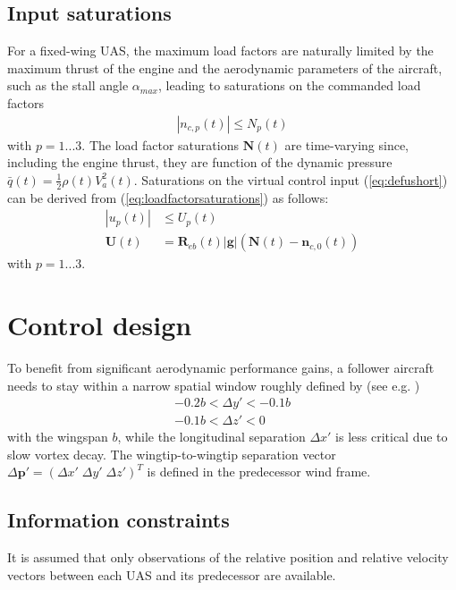 \documentclass{ifacconf}
\providecommand{\mbf}[1]{\mathbf{#1}}
\newcommand{\idxAxis}{{\ensuremath{p}}}
\begin{document}
\subsection{Input saturations}
For a fixed-wing UAS, the maximum load factors are naturally limited by the maximum thrust of the engine and the aerodynamic parameters of the aircraft, such as the stall angle $\alpha_{max}$, leading to saturations on the commanded load factors
\begin{align}
|{n}_{c, \idxAxis}(t)| \leq {N}_\idxAxis(t)
\label{eq:loadfactorsaturations}
\end{align}
with $\idxAxis = 1...3$. The load factor saturations $\mbf{N}(t)$ are time-varying since, including the engine thrust, they are function of the dynamic pressure $\bar{q}(t) = \frac{1}{2}\rho(t) V_a^2(t)$.
Saturations on the virtual control input (\ref{eq:defushort}) can be derived from (\ref{eq:loadfactorsaturations}) as follows:
\begin{align}
|{u}_\idxAxis(t)| &\leq {U}_\idxAxis(t) \\
\mbf{U}(t) &= \mbf{R}_{eb}(t) |\mbf{g}|(\mbf{N}(t)-\mbf{n}_{c,0}(t))
\label{eq:saturationsonU}
\end{align}
with $\idxAxis = 1...3$.
\section{Control design}
\label{sec:controldesign}
To benefit from significant aerodynamic performance gains, a follower aircraft needs to stay within a narrow spatial window roughly defined by (see e.g. \cite{jake2003f})
\begin{align}
-0.2 b < \Delta y' < -0.1 b \\
-0.1 b < \Delta z' < 0 
\label{eq:windowz}
\end{align}
with the wingspan $b$, while the longitudinal separation $\Delta x'$ is less critical due to slow vortex decay. The wingtip-to-wingtip separation vector $\Delta \mbf{p'} = ( \Delta x' \; \Delta y' \; \Delta z')^T$ is defined in the predecessor wind frame.
\subsection{Information constraints}
It is assumed that only observations of the relative position and relative velocity vectors between each UAS and its predecessor are available.
\end{document}
